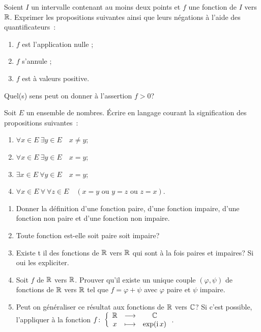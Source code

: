 \begin{exercice}

    Soient \(I\) un intervalle contenant au moins deux points et \(f\) une fonction de \(I\) vers \(\mathbb{R}\). Exprimer les
    propositions suivantes ainsi que leurs négations à l'aide des quantificateurs~:
    \begin{enumerate}
        \item \(f\) est l'application nulle ;
        \item \(f\) s'annule ;
        \item \(f\) est à valeurs positive.
    \end{enumerate}
    Quel(s) sens peut on donner à l'assertion \(f>0\)?
\end{exercice}
\begin{exercice}
    Soit \(E\) un ensemble de nombres. Écrire en langage courant la signification des propositions suivantes~:
    \begin{enumerate}
        \item \(\forall x \in E \ \exists y \in E \quad x \neq y\);
        \item \(\forall x \in E \ \exists y \in E \quad x = y\);
        \item \(\exists x \in E \ \forall y \in E \quad x = y\);
        \item \(\forall x \in E \ \forall \ \forall z \in E \quad (x=y \textrm{~ou~}
            y=z \textrm{~ou~} z=x)\).
    \end{enumerate}
\end{exercice}
\begin{exercice}

    \begin{enumerate}
        \item Donner la définition d'une fonction paire, d'une fonction impaire,
            d'une fonction non paire et d'une fonction non impaire.
        \item Toute fonction est-elle soit paire soit impaire?
        \item Existe t il des fonctions de \(\mathbb{R}\) vers \(\mathbb{R}\) qui sont à la fois
            paires  et impaires? Si oui les expliciter.
        \item Soit \(f\) de \(\mathbb{R}\) vers \(\mathbb{R}\). Prouver qu'il existe un unique
            couple \((\varphi, \psi)\) de fonctions de \(\mathbb{R}\) vers \(\mathbb{R}\) tel que
            \(f=\varphi+\psi\) avec \(\varphi\) paire et \(\psi\) impaire.
        \item Peut on généraliser ce résultat aux fonctions de \(\mathbb{R}\) vers \(\mathbb{C}\)?
            Si c'est possible, l'appliquer à la fonction
            \(f\colon \left\{\begin{array}{ccc} \mathbb{R} & \longrightarrow &\mathbb{C}\\ x & \longmapsto & \exp(\operatorname{i} x) \end{array} \right.\).
    \end{enumerate}
\end{exercice}
